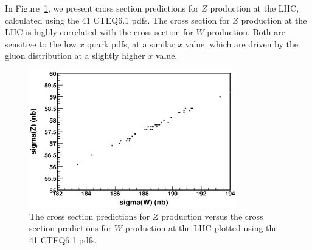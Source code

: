 \documentclass[12pt]{iopart}
\begin{document}
In Figure~\ref{fig:Z_W_LHC},  we present cross section predictions for $Z$ production at the LHC, calculated using the 41 CTEQ6.1 pdfs. The cross section for $Z$ production  at the LHC is highly correlated with the cross
section for $W$ production. Both are sensitive to the low $x$ quark pdfs, at a similar $x$ value, which are
driven by the gluon distribution at a slightly higher $x$ value. 

%
\begin{figure}[t]
\begin{center}
\includegraphics[width=9cm]{Z_vs_W.eps}
\end{center}
\caption{
The cross section predictions for $Z$ production versus  the cross section predictions for $W$
production at the LHC plotted using the 41 CTEQ6.1 pdfs. } 
\label{fig:Z_W_LHC}
\end{figure}
%
\end{document}

